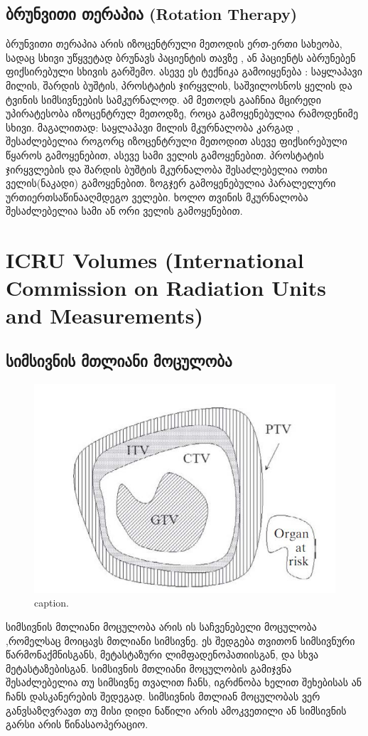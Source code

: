 \documentclass[12pt,a4paper,]{report}
\begin{document}
\section{ბრუნვითი თერაპია (Rotation Therapy)}
ბრუნვითი თერაპია არის იზოცენტრული მეთოდის ერთ-ერთი სახეობა, სადაც სხივი უწყვეტად ბრუნავს პაციენტის თავზე , ან პაციენტს აბრუნებენ ფიქსირებული სხივის გარშემო. ასევე ეს ტექნიკა გამოიყენება : საყლაპავი მილის, შარდის ბუშტის, პროსტატის ჯირყვლის, საშვილოსნოს ყელის და ტვინის სიმსივნეების სამკურნალოდ.  ამ მეთოდს გააჩნია მცირედი უპირატესობა იზოცენტრულ მეთოდზე, როცა გამოყენებულია რამოდენიმე სხივი. მაგალითად: საყლაპავი მილის მკურნალობა კარგად , შესაძლებელია როგორც იზოცენტრული მეთოდით ასევე ფიქსირებული წყაროს გამოყენებით, ასევე სამი ველის გამოყენებით.  პროსტატის ჯირყვლების და შარდის ბუშტის მკურნალობა შესაძლებელია ოთხი ველის(ნაკადი) გამოყენებით.  ზოგჯერ გამოყენებულია პარალელური ურთიერთსაწინააღმდეგო ველები. ხოლო თვინის მკურნალობა შესაძლებელია სამი ან ორი ველის გამოყენებით.

\chapter{ICRU Volumes (International Commission on Radiation Units and Measurements)}
\section{სიმსივნის მთლიანი მოცულობა}

	\begin{figure}
	    \centering
        \includegraphics[width=.7\linewidth]{images/gross_tumor_volume}
        \caption{caption.}
    \end{figure}

სიმსივნის მთლიანი მოცულობა არის ის საჩვენებელი მოცულობა ,რომელსაც მოიცავს მთლიანი სიმსივნე. ეს შედგება თვითონ სიმსივნური წარმონაქმნისგანს, მეტასტაზური ლიმფადენოპათიისგან,  და სხვა მეტასტაზებისგან. სიმსივნის მთლიანი მოცულობის გამიჯვნა შესაძლებელია თუ სიმსივნე თვალით ჩანს, იგრძნობა ხელით შეხებისას ან ჩანს დასკანერების შედეგად. სიმსივნის მთლიან მოცულობას ვერ განვსაზღვრავთ თუ მისი დიდი ნაწილი არის ამოკვეთილი ან სიმსივნის გარსი არის წინასაოპერაციო. 
\end{document}
